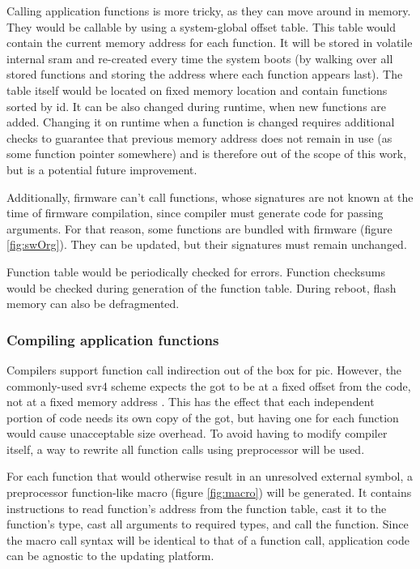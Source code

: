 Calling application functions is more tricky, as they can move around in memory. They would be callable by using a system-global offset table. This table would contain the current memory address for each function. It will be stored in volatile internal \gls{sram} and re-created every time the system boots (by walking over all stored functions and storing the address where each function appears last). The table itself would be located on fixed memory location and contain functions sorted by id. It can be also changed during runtime, when new functions are added. Changing it on runtime when a function is changed requires additional checks to guarantee that previous memory address does not remain in use (as some function pointer somewhere) and is therefore out of the scope of this work, but is a potential future improvement.

Additionally, firmware can't call functions, whose signatures are not known at the time of firmware compilation, since compiler must generate code for passing arguments. For that reason, some functions  are bundled with firmware (figure \ref{fig:swOrg}). They can be updated, but their signatures must remain unchanged.

Function table would be periodically checked for errors. Function checksums would be checked during generation of the function table. During reboot, flash memory can also be defragmented.

\subsubsection{Compiling application functions}

Compilers support function call indirection out of the box for \gls{pic}. However, the commonly-used \gls{svr4} scheme expects the \gls{got} to be at a fixed offset from the code, not at a fixed memory address \cite[Chapter~8]{Levine1999}. This has the effect that each independent portion of code needs its own copy of the \gls{got}, but having one for each function would cause unacceptable size overhead. To avoid having to modify compiler itself, a way to rewrite all function calls using preprocessor will be used.

For each function that would otherwise result in an unresolved external symbol, a preprocessor function-like macro (figure \ref{fig:macro}) will be generated. It contains instructions to read function's address from the function table, cast it to the function's type, cast all arguments to required types, and call the function. Since the macro call syntax will be identical to that of a function call, application code can be agnostic to the updating platform.

